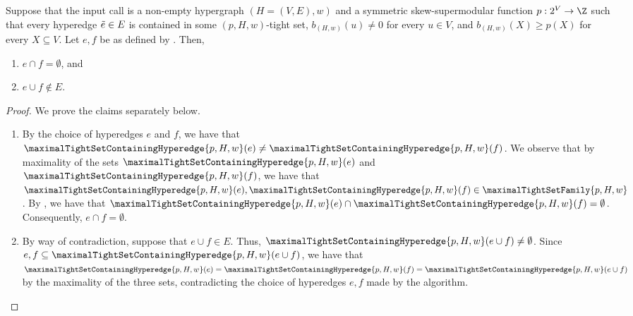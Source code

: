 \begin{lemma}\label{lem:WeakToStrongCover:properties-of-e-and-f-chosen-during-alg}
    Suppose that the input  call is a non-empty hypergraph $(H = (V, E), w)$ and a symmetric skew-supermodular function $p:2^V\rightarrow \Z$ %
such that every hyperedge $\Tilde{e} \in E$ is contained in some $(p, H, w)$-tight set, $b_{(H,w)}(u) \not = 0$ for every $u \in V$, and $b_{(H,w)}(X) \geq p(X)$ for every $X \subseteq V$.  Let $e, f$ be as defined by . Then,
\begin{enumerate}
    \item $e \cap f = \emptyset$, and
    \item $e\cup f \not \in E$.
\end{enumerate}
\end{lemma}
\begin{proof} We prove the claims separately below.
    \begin{enumerate}
        \item By the choice of hyperedges $e$ and $f$, we have that $\maximalTightSetContainingHyperedge{p, H, w}(e) \not = \maximalTightSetContainingHyperedge{p, H, w}(f)$. We observe that by maximality of the sets $\maximalTightSetContainingHyperedge{p, H, w}(e)$ and $\maximalTightSetContainingHyperedge{p, H, w}(f)$, we have that $\maximalTightSetContainingHyperedge{p, H, w}(e), \maximalTightSetContainingHyperedge{p, H, w}(f) \in \maximalTightSetFamily{p, H, w}$. By , we have that $\maximalTightSetContainingHyperedge{p, H, w}(e) \cap  \maximalTightSetContainingHyperedge{p, H, w}(f) = \emptyset$. Consequently, $e \cap f = \emptyset$.
        \item By way of contradiction, suppose that $e\cup f \in E$. Thus, $\maximalTightSetContainingHyperedge{p, H, w}(e\cup f) \not = \emptyset$. Since $e, f \subseteq \maximalTightSetContainingHyperedge{p, H, w}(e\cup f)$, we have that $\maximalTightSetContainingHyperedge{p, H, w}(e) = \maximalTightSetContainingHyperedge{p, H, w}(f) = \maximalTightSetContainingHyperedge{p, H, w}(e\cup f)$ by the maximality of the three sets, contradicting the choice of hyperedges $e, f$ made by the algorithm.
    \end{enumerate}
\end{proof}

